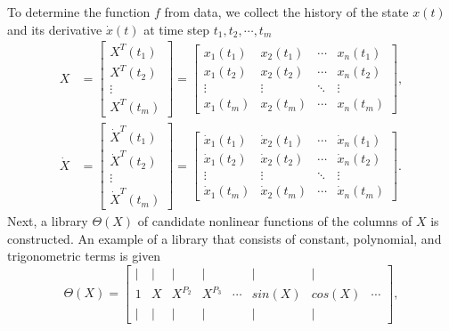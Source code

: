 To determine the function $f$ from data, we collect the history of the state $x(t)$ and its derivative $\dot{x}(t)$ at time step $t_1, t_2, \cdots, t_m$ \cite{bruntonDiscoveringGoverningEquations2016}
\begin{align*}
    X &=
    \begin{bmatrix}
        X^T(t_1) \\
        X^T(t_2) \\
        \vdots \\
        X^T(t_m)
    \end{bmatrix} =
    \begin{bmatrix}
        x_1(t_1) & x_2(t_1) & \cdots & x_n(t_1) \\
        x_1(t_2) & x_2(t_2) & \cdots & x_n(t_2) \\
        \vdots & \vdots & \ddots & \vdots \\
        x_1(t_m) & x_2(t_m) & \cdots & x_n(t_m)
    \end{bmatrix}, \\
    \dot{X} &=
    \begin{bmatrix}
        \dot{X}^T(t_1) \\
        \dot{X}^T(t_2) \\
        \vdots \\
        \dot{X}^T(t_m)
    \end{bmatrix} =
    \begin{bmatrix}
        \dot{x}_1(t_1) & \dot{x}_2(t_1) & \cdots & \dot{x}_n(t_1) \\
        \dot{x}_1(t_2) & \dot{x}_2(t_2) & \cdots & \dot{x}_n(t_2) \\
        \vdots & \vdots & \ddots & \vdots \\
        \dot{x}_1(t_m) & \dot{x}_2(t_m) & \cdots & \dot{x}_n(t_m)
    \end{bmatrix}.
\end{align*}
Next, a library $\Theta(X)$ of candidate nonlinear functions of the columns of $X$ is constructed.
An example of a library that consists of constant, polynomial, and trigonometric terms is given \cite{bruntonDiscoveringGoverningEquations2016}
\begin{equation*}
    \Theta(X) = \begin{bmatrix}
        | & | & |       & |       &        & |      & |      & \\
        1 & X & X^{P_2} & X^{P_3} & \cdots & sin(X) & cos(X) & \cdots \\
        | & | & |       & |       &        & |      & |      &
    \end{bmatrix},
\end{equation*}
